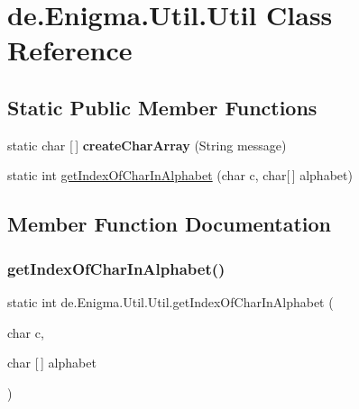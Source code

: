 \hypertarget{classde_1_1_enigma_1_1_util_1_1_util}{}\section{de.\+Enigma.\+Util.\+Util Class Reference}
\label{classde_1_1_enigma_1_1_util_1_1_util}
\subsection*{Static Public Member Functions}
\begin{DoxyCompactItemize}
\item 
\mbox{\label{classde_1_1_enigma_1_1_util_1_1_util_a1ae628e98776e06f1c48d627a58d3346}} 
static char \mbox{[}$\,$\mbox{]} {\bfseries create\+Char\+Array} (String message)
\item 
static int \hyperlink{classde_1_1_enigma_1_1_util_1_1_util_a8583f6d14bfa89ee6ce77bf065449086}{get\+Index\+Of\+Char\+In\+Alphabet} (char c, char\mbox{[}$\,$\mbox{]} alphabet)
\end{DoxyCompactItemize}


\subsection{Member Function Documentation}
\mbox{\label{classde_1_1_enigma_1_1_util_1_1_util_a8583f6d14bfa89ee6ce77bf065449086}} 
\subsubsection{\texorpdfstring{get\+Index\+Of\+Char\+In\+Alphabet()}{getIndexOfCharInAlphabet()}}
{\footnotesize\ttfamily static int de.\+Enigma.\+Util.\+Util.\+get\+Index\+Of\+Char\+In\+Alphabet (\begin{DoxyParamCaption}\item[{char}]{c,  }\item[{char \mbox{[}$\,$\mbox{]}}]{alphabet }\end{DoxyParamCaption})\hspace{0.3cm}{\ttfamily [static]}}

